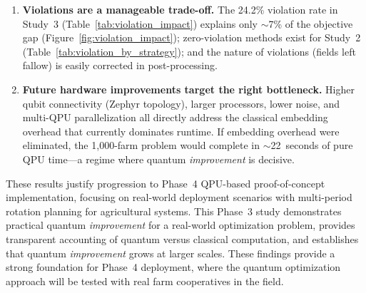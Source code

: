 \begin{enumerate}
    \item \textbf{Violations are a manageable trade-off.} The 24.2\% violation rate in Study~3 (Table~\ref{tab:violation_impact}) explains only $\sim$7\% of the objective gap (Figure~\ref{fig:violation_impact}); zero-violation methods exist for Study~2 (Table~\ref{tab:violation_by_strategy}); and the nature of violations (fields left fallow) is easily corrected in post-processing.
    
    \item \textbf{Future hardware improvements target the right bottleneck.} Higher qubit connectivity (Zephyr topology), larger processors, lower noise, and multi-QPU parallelization all directly address the classical embedding overhead that currently dominates runtime. If embedding overhead were eliminated, the 1,000-farm problem would complete in $\sim$22~seconds of pure QPU time---a regime where quantum \textit{improvement} is decisive.
\end{enumerate}

These results justify progression to Phase~4 QPU-based proof-of-concept implementation, focusing on real-world deployment scenarios with multi-period rotation planning for agricultural systems. This Phase~3 study demonstrates practical quantum \textit{improvement} for a real-world optimization problem, provides transparent accounting of quantum versus classical computation, and establishes that quantum \textit{improvement} grows at larger scales. These findings provide a strong foundation for Phase~4 deployment, where the quantum optimization approach will be tested with real farm cooperatives in the field.